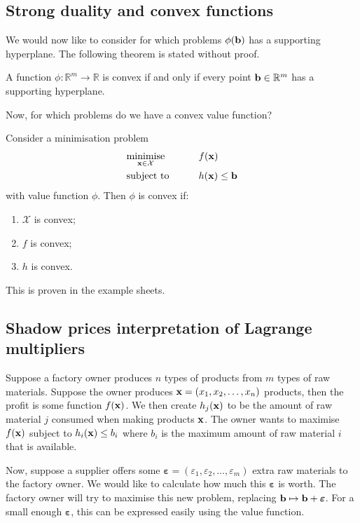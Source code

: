 \subsection{Strong duality and convex functions}
We would now like to consider for which problems \( \phi(\vb b) \) has a supporting hyperplane.
The following theorem is stated without proof.
\begin{theorem}
	A function \( \phi \colon \mathbb R^m \to \mathbb R \) is convex if and only if every point \( \vb b \in \mathbb R^m \) has a supporting hyperplane.
\end{theorem}
Now, for which problems do we have a convex value function?
\begin{theorem}
	Consider a minimisation problem
	\begin{alignat*}{2}
		 & \underset{\vb x \in \mathcal X}{\text{minimise}} & \qquad & f(\vb x)            \\
		 & \text{subject to}                                &        & h(\vb x) \leq \vb b
	\end{alignat*}
	with value function \( \phi \).
	Then \( \phi \) is convex if:
	\begin{enumerate}
		\item \( \mathcal X \) is convex;
		\item \( f \) is convex;
		\item \( h \) is convex.
	\end{enumerate}
\end{theorem}
\noindent This is proven in the example sheets.

\subsection{Shadow prices interpretation of Lagrange multipliers}
Suppose a factory owner produces \( n \) types of products from \( m \) types of raw materials.
Suppose the owner produces \( \vb x = (x_1, x_2, \dots, x_n) \) products, then the profit is some function \( f(\vb x) \).
We then create \( h_j(\vb x) \) to be the amount of raw material \( j \) consumed when making products \( \vb x \).
The owner wants to maximise \( f(\vb x) \) subject to \( h_i(\vb x) \leq b_i \) where \( b_i \) is the maximum amount of raw material \( i \) that is available.

Now, suppose a supplier offers some \( \bm\varepsilon = (\varepsilon_1, \varepsilon_2, \dots, \varepsilon_m) \) extra raw materials to the factory owner.
We would like to calculate how much this \( \bm\varepsilon \) is worth.
The factory owner will try to maximise this new problem, replacing \( \vb b \mapsto \vb b + \bm\varepsilon \).
For a small enough \( \bm\varepsilon \), this can be expressed easily using the value function.

